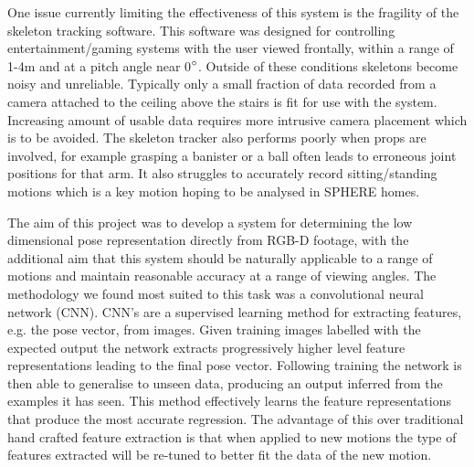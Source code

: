 \documentclass[11pt]{article} %
\begin{document}
One issue currently limiting the effectiveness of this system is the fragility of the skeleton tracking software. This software was designed for controlling entertainment/gaming systems with the user viewed frontally, within a range of 1-4m and at a pitch angle near 0$\degree$. Outside of these conditions skeletons become noisy and unreliable. Typically only a small fraction of data recorded from a camera attached to the ceiling above the stairs is fit for use with the system. Increasing amount of usable data requires more intrusive camera placement which is to be avoided. The skeleton tracker also performs poorly when props are involved, for example grasping a banister or a ball often leads to erroneous joint positions for that arm. It also struggles to accurately record sitting/standing motions which is a key motion hoping to be analysed in SPHERE homes.

The aim of this project was to develop a system for determining the low dimensional pose representation directly from RGB-D footage, with the additional aim that this system should be naturally applicable to a range of motions and maintain reasonable accuracy at a range of viewing angles. The methodology we found most suited to this task was a convolutional neural network (CNN). CNN's are a supervised learning method for extracting features, e.g. the pose vector, from images. Given training images labelled with the expected output the network extracts progressively higher level feature representations leading to the final pose vector. Following training the network is then able to generalise to unseen data, producing an output inferred from the examples it has seen. This method effectively learns the feature representations that produce the most accurate regression. The advantage of this over traditional hand crafted feature extraction is that when applied to new motions the type of features extracted will be re-tuned to better fit the data of the new motion.
\end{document}
